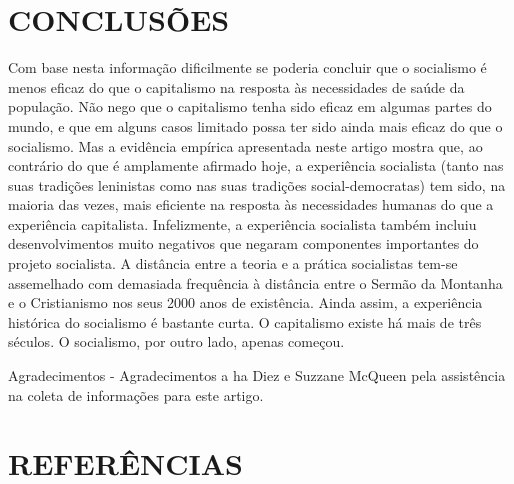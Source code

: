 \documentclass[twocolumn,amsmath,amssymb,aps,pre,floatfix]{revtex4-2}
\begin{document}
\section{CONCLUSÕES}

\par
Com base nesta informação dificilmente se poderia concluir que o socialismo é menos eficaz do que o capitalismo na resposta às necessidades de saúde da população. Não nego que o capitalismo tenha sido eficaz em algumas partes do mundo, e que em alguns casos limitado possa ter sido ainda mais eficaz do que o socialismo. Mas a evidência empírica apresentada neste artigo mostra que, ao contrário do que é amplamente afirmado hoje, a experiência socialista (tanto nas suas tradições leninistas como nas suas tradições social-democratas) tem sido, na maioria das vezes, mais eficiente na resposta às necessidades humanas do que a experiência capitalista. Infelizmente, a experiência socialista também incluiu desenvolvimentos muito negativos que negaram componentes importantes do projeto socialista. A distância entre a teoria e a prática socialistas tem-se assemelhado com demasiada frequência à distância entre o Sermão da Montanha e o Cristianismo nos seus 2000 anos de existência. Ainda assim, a experiência histórica do socialismo é bastante curta. O capitalismo existe há mais de três séculos. O socialismo, por outro lado, apenas começou.
\par
Agradecimentos - Agradecimentos a ha Diez e Suzzane McQueen pela assistência na coleta de informações para este artigo.
\par

\section{REFERÊNCIAS}
\end{document}
